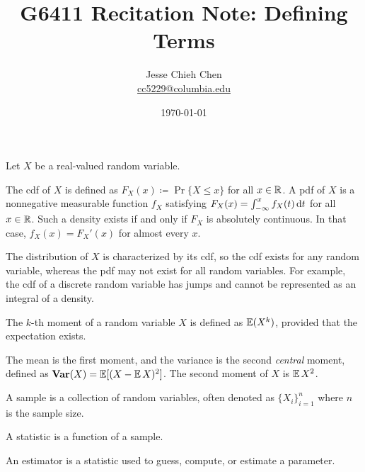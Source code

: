 \documentclass[a4paper,12pt]{article}
\title{G6411 Recitation Note: Defining Terms}
\author{Jesse Chieh Chen\\\href{mailto:cc5229@columbia.edu}{cc5229@columbia.edu}}
\date{\today}
\begin{document}
\maketitle

\noindent
Let $X$ be a real-valued random variable.

\begin{definition}\label{def-cdf-pdf}
	The \gls{cdf} of $X$ is defined as $F_X(x) \coloneqq \Pr\{X \leq x\}$ for all $x \in \mathbb{R}$.
	A \gls{pdf} of $X$ is a nonnegative measurable function $f_X$ satisfying
	$F_X(x)=\int_{-\infty}^{x}f_X(t)\mathop{}\!{\mathrm{d}}{t}$ for all $x\in\mathbb{R}$.
	Such a density exists if and only if $F_X$ is absolutely continuous.
	In that case, $f_X(x)=F_X'(x)$ for almost every $x$.
\end{definition}

\begin{remark}
	The distribution of $X$ is characterized by its \gls{cdf},
	so the \gls{cdf} exists for any random variable,
	whereas the \gls{pdf} may not exist for all random variables.
	For example, the \gls{cdf} of a discrete random variable has jumps and cannot be represented as an integral of a density.
\end{remark}

\begin{definition}[Moment]\label{def-moment}
	The $k$-th moment of a random variable $X$ is defined as $\operatorname{\mathbb{E}}(X^k)$, provided that the expectation exists.
\end{definition}

\begin{remark}
	The mean is the first moment,
	and the variance is the second \emph{central} moment,
	defined as $\operatorname{\text{\textrm{\upshape\textbf{Var}}}}(X) = \operatorname{\mathbb{E}}[(X - \operatorname{\mathbb{E}} X)^2]$.
	The second moment of $X$ is $\operatorname{\mathbb{E}} X^2$.
\end{remark}

\begin{definition}[Sample]\label{def-sample}
	A sample is a collection of random variables,
	often denoted as $\{X_i\}_{i=1}^{n}$ where $n$ is the sample size.
\end{definition}

\begin{definition}[Statistic]\label{def-statistic}
	A statistic is a function of a sample.
\end{definition}

\begin{definition}[Estimator]\label{def-estimator}
	An estimator is a statistic used to guess, compute, or estimate a parameter.
\end{definition}
\end{document}
